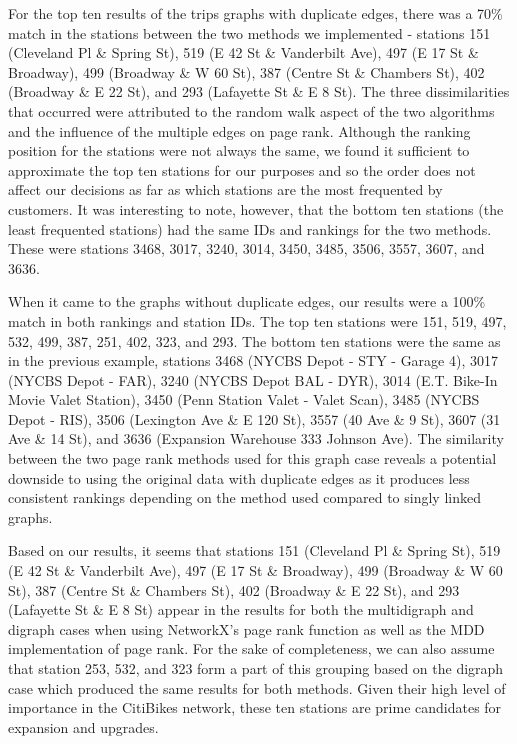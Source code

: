\documentclass{article}
\begin{document}
	For the top ten results of the trips graphs with duplicate edges, there was a 70\% match in the stations between the two methods we implemented - stations 151 (Cleveland Pl \& Spring St), 519 (E 42 St \& Vanderbilt Ave), 497 (E 17 St \& Broadway), 499 (Broadway \& W 60 St), 387 (Centre St \& Chambers St), 402 (Broadway \& E 22 St), and 293 (Lafayette St \& E 8 St). The three dissimilarities that occurred were attributed to the random walk aspect of the two algorithms and the influence of the multiple edges on page rank. Although the ranking position for the stations were not always the same, we found it sufficient to approximate the top ten stations for our purposes and so the order does not affect our decisions as far as which stations are the most frequented by customers. It was interesting to note, however, that the bottom ten stations (the least frequented stations) had the same IDs and rankings for the two methods. These were stations  3468, 3017, 3240, 3014, 3450, 3485, 3506, 3557, 3607, and 3636. 
 \par
	When it came to the graphs without duplicate edges, our results were a 100\% match in both rankings and station IDs. The top ten stations were 151, 519, 497, 532, 499, 387, 251, 402, 323, and 293. The bottom ten stations were the same as in the previous example, stations 3468 (NYCBS Depot - STY - Garage 4), 3017 (NYCBS Depot - FAR), 3240 (NYCBS Depot BAL - DYR), 3014 (E.T. Bike-In Movie Valet Station), 3450 (Penn Station Valet - Valet Scan), 3485 (NYCBS Depot - RIS), 3506 (Lexington Ave \& E 120 St), 3557 (40 Ave \& 9 St), 3607 (31 Ave \& 14 St), and 3636 (Expansion Warehouse 333 Johnson Ave). The similarity between the two page rank methods used for this graph case reveals a potential downside to using the original data with duplicate edges as it produces less consistent rankings depending on the method used compared to singly linked graphs. 
 \par
 Based on our results, it seems that stations 151 (Cleveland Pl \& Spring St), 519 (E 42 St \& Vanderbilt Ave), 497 (E 17 St \& Broadway), 499 (Broadway \& W 60 St), 387 (Centre St \& Chambers St), 402 (Broadway \& E 22 St), and 293 (Lafayette St \& E 8 St) appear in the results for both the multidigraph and digraph cases when using NetworkX’s page rank function as well as the MDD implementation of page rank. For the sake of completeness, we can also assume that station 253, 532, and 323 form a part of this grouping based on the digraph case which produced the same results for both methods. Given their high level of importance in the CitiBikes network, these ten stations are prime candidates for expansion and upgrades. 
\end{document}
